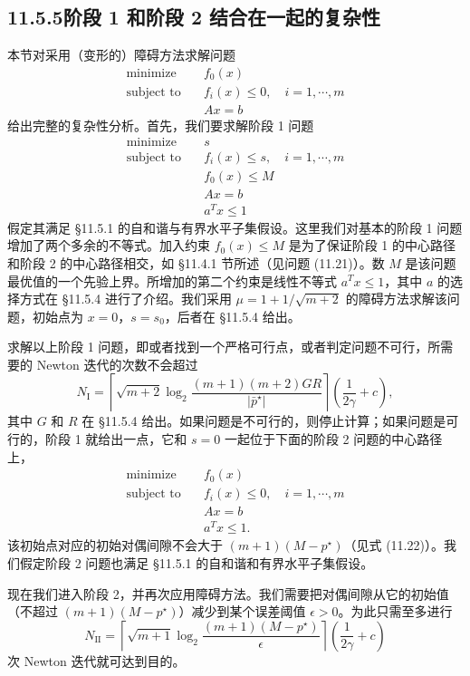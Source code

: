 \documentclass[UTF8,12pt,a4paper,fontset=fandol]{ctexart}
\begin{document}
\subsection*{11.5.5\quad 阶段 1 和阶段 2 结合在一起的复杂性}

本节对采用（变形的）障碍方法求解问题
\[
\begin{aligned}
\text{minimize}\quad & f_0(x)\\
\text{subject to}\quad & f_i(x)\leq 0,\quad i=1,\cdots,m\\
& Ax=b
\end{aligned}
\]
给出完整的复杂性分析。首先，我们要求解阶段 1 问题
\[
\begin{aligned}
\text{minimize}\quad & s\\
\text{subject to}\quad & f_i(x)\leq s,\quad i=1,\cdots,m\\
& f_0(x)\leq M\\
& Ax=b\\
& a^Tx\leq 1
\end{aligned}
\]
假定其满足 \S11.5.1 的自和谐与有界水平子集假设。这里我们对基本的阶段 1 问题增加了两个多余的不等式。加入约束 $f_0(x)\leq M$ 是为了保证阶段 1 的中心路径和阶段 2 的中心路径相交，如 \S11.4.1 节所述（见问题 (11.21)）。数 $M$ 是该问题最优值的一个先验上界。所增加的第二个约束是线性不等式 $a^Tx\leq 1$，其中 $a$ 的选择方式在 \S11.5.4 进行了介绍。我们采用 $\mu=1+1/\sqrt{m+2}$ 的障碍方法求解该问题，初始点为 $x=0$，$s=s_0$，后者在 \S11.5.4 给出。

求解以上阶段 1 问题，即或者找到一个严格可行点，或者判定问题不可行，所需要的 Newton 迭代的次数不会超过
\begin{equation}
N_{\mathrm{I}}=\left\lceil\sqrt{m+2}\log_2\frac{(m+1)(m+2)GR}{|\bar{p}^\star|}\right\rceil
\left(\frac{1}{2\gamma}+c\right),
\tag{11.36}
\end{equation}
其中 $G$ 和 $R$ 在 \S11.5.4 给出。如果问题是不可行的，则停止计算；如果问题是可行的，阶段 1 就给出一点，它和 $s=0$ 一起位于下面的阶段 2 问题的中心路径上，
\[
\begin{aligned}
\text{minimize}\quad & f_0(x)\\
\text{subject to}\quad & f_i(x)\leq 0,\quad i=1,\cdots,m\\
& Ax=b\\
& a^Tx\leq 1.
\end{aligned}
\]
该初始点对应的初始对偶间隙不会大于 $(m+1)(M-p^\star)$（见式 (11.22)）。我们假定阶段 2 问题也满足 \S11.5.1 的自和谐和有界水平子集假设。

现在我们进入阶段 2，并再次应用障碍方法。我们需要把对偶间隙从它的初始值（不超过 $(m+1)(M-p^\star)$）减少到某个误差阈值 $\epsilon>0$。为此只需至多进行
\begin{equation}
N_{\mathrm{II}}=\left\lceil\sqrt{m+1}\log_2\frac{(m+1)(M-p^\star)}{\epsilon}\right\rceil
\left(\frac{1}{2\gamma}+c\right)
\tag{11.37}
\end{equation}
次 Newton 迭代就可达到目的。
\end{document}

